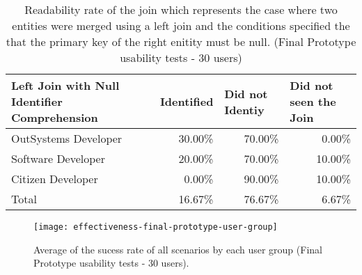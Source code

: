 \begin{table}[tb]
  \caption{Readability rate of the join which represents the case where two entities were merged using a left join and the conditions specified the that the primary key of the right enitity must be null. (Final Prototype usability tests - 30 users)}
    \label{tab:finalPrototypeLeftJoinNull}
  \begin{tabular}{@{}m{5.4cm}rrr@{}}
  \toprule
  \textbf{Left Join with Null Identifier Comprehension} & \multicolumn{1}{l}{Identified} & \multicolumn{1}{l}{Did not Identiy} & \multicolumn{1}{l}{Did not seen the Join} \\ \midrule
  OutSystems Developer                                  & 30.00\%                        & 70.00\%                                & 0.00\%                                    \\
  Software Developer                                    & 20.00\%                        & 70.00\%                                & 10.00\%                                   \\
  Citizen Developer                                     & 0.00\%                         & 90.00\%                                & 10.00\%                                   \\
  Total                                                 & 16.67\%                        & 76.67\%                                & 6.67\%                                    \\ \bottomrule
  \end{tabular}
  \end{table}


\begin{figure}[htbp]
	\centering
	\texttt{[image: effectiveness-final-prototype-user-group]}
	\caption{Average of the sucess rate of all scenarios by each user group (Final Prototype usability tests - 30 users).}
	\label{fig:effectivenessFinalPrototypeUserGroup}
\end{figure}

